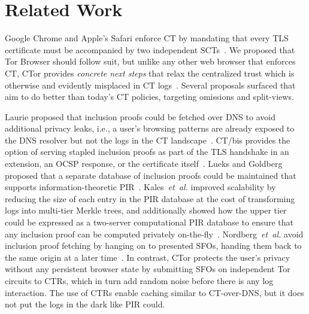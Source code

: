 \section{Related Work} \label{sec:related}
Google Chrome and Apple's Safari enforce CT by mandating that every TLS
certificate must be accompanied by two independent
SCTs~\cite{chrome-policy,safari-policy}.  We proposed that Tor Browser should
follow suit, but unlike any other web browser that enforces CT, CTor provides
\emph{concrete next steps} that relax the centralized trust which is otherwise
and evidently misplaced in CT logs~\cite{%
	izenpe-disqualified,%
	venafi-disqualified,%
	gdca1-omission,%
	digicert-log-compromised%
}.  Several proposals surfaced that aim to do better than today's CT
policies, targeting omissions and split-views.

Laurie proposed that inclusion proofs could be fetched over DNS to avoid
additional privacy leaks, i.e., a user's browsing patterns are already exposed
to the DNS resolver but not the logs in the CT landscape~\cite{ct-over-dns}.
CT/bis provides the option of serving stapled inclusion proofs as part of the
TLS handshake in an extension, an OCSP response, or the certificate
itself~\cite{ct/bis}. Lueks and Goldberg proposed that a separate database of
inclusion proofs could be maintained that supports information-theoretic
PIR~\cite{lueks-and-goldberg}. Kales~\emph{et~al.} improved scalability by
reducing the size of each entry in the PIR database at the cost of transforming
logs into multi-tier Merkle trees, and additionally showed how the upper tier
could be expressed as a two-server computational PIR database to ensure that any
inclusion proof can be computed privately on-the-fly~\cite{kales}.
Nordberg~\emph{et~al.} avoid inclusion proof fetching by hanging on to presented
SFOs, handing them back to the same origin at a later time~\cite{nordberg}. In
contrast, CTor protects the user's privacy without any persistent browser state
by submitting SFOs on independent Tor circuits to CTRs, which in turn add random
noise before there is any log interaction.  The use of CTRs enable caching
similar to CT-over-DNS, but it does not put the logs in the dark like PIR could.

